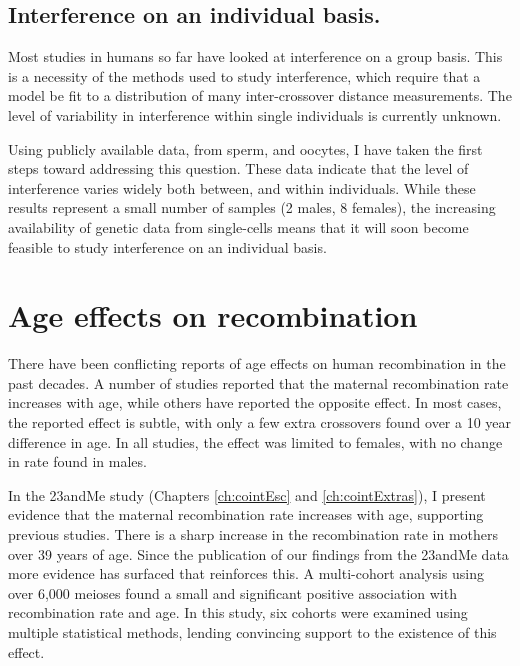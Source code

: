 \subsection{Interference on an individual basis.}

Most studies in humans so far have looked at interference on a group basis.
This is a necessity of the methods used to study interference, which require that a model be fit to a distribution of many inter-crossover distance measurements.
The level of variability in interference within single individuals is currently unknown.

Using publicly available data, from sperm\cite{Wang2012,Lu2012}, and oocytes\cite{Hou2013}, I have taken the first steps toward addressing this question.
These data indicate that the level of interference varies widely both between, and within individuals.
While these results represent a small number of samples (2 males, 8 females), the increasing availability of genetic data from single-cells means that it will soon become feasible to study interference on an individual basis.



\section{Age effects on recombination}


There have been conflicting reports of age effects on human recombination in the past decades.
A number of studies reported that the maternal recombination rate increases with age\cite{Kong2004,Coop2008}, while others have reported the opposite effect\cite{Hussin2011,Bleazard2013}.
In most cases, the reported effect is subtle, with only a few extra crossovers found over a 10 year difference in age.
In all studies, the effect was limited to females, with no change in rate found in males.

In the 23andMe study (Chapters \ref{ch:cointEsc} and \ref{ch:cointExtras}), I present evidence that the maternal recombination rate increases with age, supporting previous studies.
There is a sharp increase in the recombination rate in mothers over 39 years of age.
Since the publication of our findings from the 23andMe data more evidence has surfaced that reinforces this.
A multi-cohort analysis using over 6,000 meioses found a small and significant positive association with recombination rate and age\cite{Martin2015}.
In this study, six cohorts were examined using multiple statistical methods, lending convincing support to the existence of this effect.

